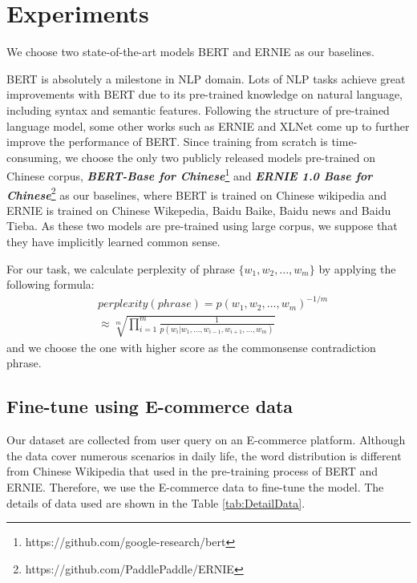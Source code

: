\section{Experiments}
\label{sec:exp}
We choose two state-of-the-art models BERT \cite{devlin2018bert} and ERNIE \cite{sun2019ernie} as our baselines. 

BERT is absolutely a milestone in NLP domain. Lots of NLP tasks achieve great improvements with BERT due to its pre-trained knowledge on natural language, including syntax and semantic features. 
Following the structure of pre-trained language model, some other works such as ERNIE and XLNet \cite{yang2019xlnet} come up to further improve the performance of BERT. 
Since training from scratch %
is time-consuming, we choose the only two publicly released models pre-trained on Chinese corpus, \textbf{\textit{BERT-Base for Chinese}}\footnote{https://github.com/google-research/bert}  and \textbf{\textit{ERNIE 1.0 Base for Chinese}}\footnote{https://github.com/PaddlePaddle/ERNIE} as our baselines, 
where BERT is trained on Chinese wikipedia and ERNIE is trained on Chinese Wikepedia, Baidu Baike, Baidu news and Baidu Tieba. 
As these two models are pre-trained using large corpus, we %
suppose that they have implicitly learned common sense.%

For our task, we calculate perplexity of phrase $\{w_1, w_2, ..., w_m\}$ %
by applying the following formula:
\begin{equation}
\label{ppl}
\begin{split}
&perplexity(phrase) = p(w_1, w_2, ..., w_m)^{-1/m} \\
&\approx \sqrt[m]{\prod_{i=1}^{m}\frac{1}{p(w_i|w_1,...,w_{i-1},w_{i+1},..., w_m)}}
\end{split}
\end{equation}
and we choose the one with higher score as the commonsense contradiction phrase.



\subsection{Fine-tune using E-commerce data}
Our dataset are collected from user query on an E-commerce platform. Although the data cover numerous scenarios in daily life, the word distribution is different from Chinese Wikipedia that used in the pre-training process of BERT and ERNIE. Therefore, we use the E-commerce data to fine-tune the model. The details of data used are shown in the Table \ref{tab:DetailData}.

